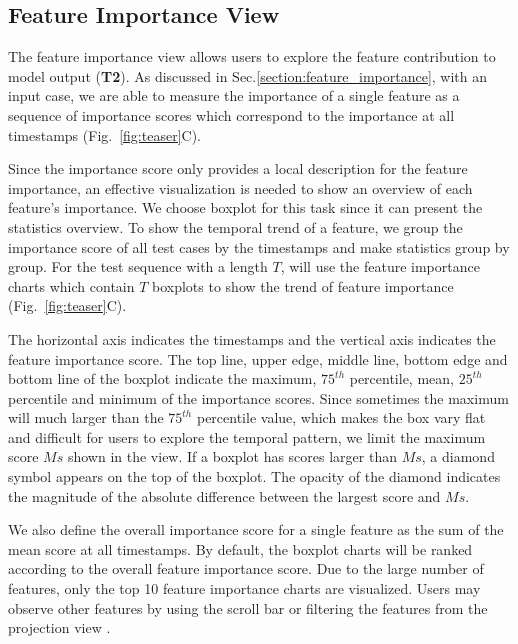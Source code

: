 \subsection{Feature Importance View}
The feature importance view allows users to explore the feature contribution to model output (\textbf{T2}).
As discussed in Sec.\ref{section:feature_importance}, with an input case, we are able to measure the importance of a single feature as a sequence of importance scores which correspond to the importance at all timestamps (Fig.~\ref{fig:teaser}C). 

Since the importance score only provides a local description for the feature importance, an effective visualization is needed to show an overview of each feature's importance. We choose boxplot for this task since it can present the statistics overview. To show the temporal trend of a feature, we group the importance score of all test cases by the timestamps and make statistics group by group. For the test sequence with a length $T$, will use the feature importance charts which contain $T$ boxplots to show the trend of feature importance (Fig.~\ref{fig:teaser}C).

The horizontal axis indicates the timestamps and the vertical axis indicates the feature importance score. The top line, upper edge, middle line, bottom edge and bottom line of the boxplot indicate the maximum,  $75^{th}$ percentile, mean, $25^{th}$ percentile and minimum of the importance scores.  Since sometimes the maximum will much larger than the $75^{th}$  percentile value, which makes the box vary flat and difficult for users to explore the temporal pattern, we limit the maximum score $Ms$ shown in the view. If a boxplot has scores larger than $Ms$, a diamond symbol appears on the top of the boxplot. The opacity of the diamond indicates the magnitude of the absolute difference between the largest score and $Ms$.    

We also define the overall importance score for a single feature as the sum of the mean score at all timestamps. By default, the boxplot charts will be ranked according to the overall feature importance score. Due to the large number of features, only the top 10 feature importance charts are visualized. Users may observe other features by using the scroll bar or filtering the features from the projection view . 

